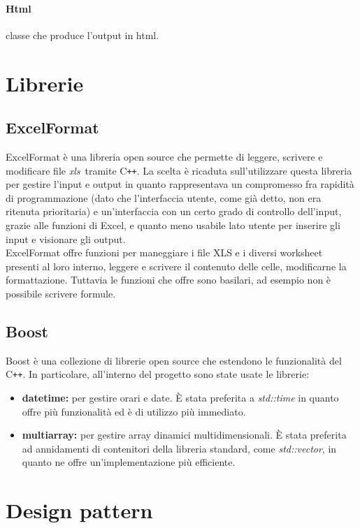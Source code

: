 \paragraph{Html} classe che produce l'output in html.
\section{Librerie}
\subsection{ExcelFormat}
ExcelFormat è una libreria open source che permette di leggere, scrivere e modificare file \emph{\gls{xls}}\glsfirstoccur\ tramite C\texttt{++}. La scelta è ricaduta sull'utilizzare questa libreria per gestire l'input e output in quanto rappresentava un compromesso fra rapidità di programmazione (dato che l'interfaccia utente, come già detto, non era ritenuta prioritaria) e un'interfaccia con un certo grado di controllo dell'input, grazie alle funzioni di Excel, e quanto meno usabile lato utente per inserire gli input e visionare gli output. \\
ExcelFormat offre funzioni per maneggiare i file XLS e i diversi worksheet presenti al loro interno, leggere e scrivere il contenuto delle celle, modificarne la formattazione. Tuttavia le funzioni che offre sono basilari, ad esempio non è possibile scrivere formule.
\subsection{Boost}
Boost  è una collezione di librerie open source che estendono le funzionalità del C\texttt{++}. In particolare, all'interno del progetto sono state usate le librerie:
\begin{itemize}
    \item \textbf{date\textunderscore time:} per gestire orari e date. È stata preferita a \textit{std::time} in quanto offre più funzionalità ed è di utilizzo più immediato.
    \item\textbf{multi\textunderscore array:} per gestire array dinamici multidimensionali. È stata preferita ad annidamenti di contenitori della libreria standard, come \textit{std::vector}, in quanto ne offre un'implementazione più efficiente.
\end{itemize}
\section{Design pattern}
